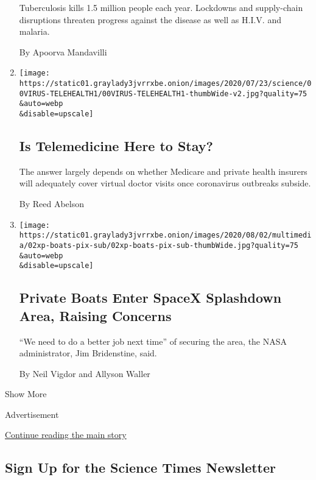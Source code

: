 \begin{enumerate}
  Tuberculosis kills 1.5 million people each year. Lockdowns and
  supply-chain disruptions threaten progress against the disease as well
  as H.I.V. and malaria.

  By Apoorva Mandavilli
\item
  \href{/2020/08/03/health/covid-telemedicine-congress.html}{}

  \texttt{[image: https://static01.graylady3jvrrxbe.onion/images/2020/07/23/science/00VIRUS-TELEHEALTH1/00VIRUS-TELEHEALTH1-thumbWide-v2.jpg?quality=75\\\&auto=webp\\\&disable=upscale]}

  \hypertarget{is-telemedicine-here-to-stay}{%
  \subsection{Is Telemedicine Here to
  Stay?}\label{is-telemedicine-here-to-stay}}

  The answer largely depends on whether Medicare and private health
  insurers will adequately cover virtual doctor visits once coronavirus
  outbreaks subside.

  By Reed Abelson
\item
  \href{/2020/08/02/us/flag-boat-SpaceX.html}{}

  \texttt{[image: https://static01.graylady3jvrrxbe.onion/images/2020/08/02/multimedia/02xp-boats-pix-sub/02xp-boats-pix-sub-thumbWide.jpg?quality=75\\\&auto=webp\\\&disable=upscale]}

  \hypertarget{private-boats-enter-spacex-splashdown-area-raising-concerns}{%
  \subsection{Private Boats Enter SpaceX Splashdown Area, Raising
  Concerns}\label{private-boats-enter-spacex-splashdown-area-raising-concerns}}

  ``We need to do a better job next time'' of securing the area, the
  NASA administrator, Jim Bridenstine, said.

  By Neil Vigdor and Allyson Waller
\end{enumerate}

Show More

Advertisement

\protect\hyperlink{after-mid2}{Continue reading the main story}

\hypertarget{sign-up-for-the-science-times-newsletter}{%
\subsection{Sign Up for the Science Times
Newsletter}\label{sign-up-for-the-science-times-newsletter}}

